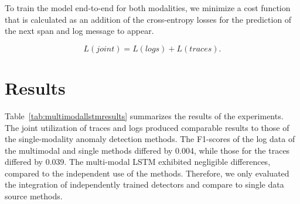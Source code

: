 To train the model end-to-end for both modalities, we minimize a cost function that is calculated as an addition of the  cross-entropy losses for the prediction of the next span and log message to appear.

\begin{equation}
    L(joint) = L(logs) + L(traces). 
\end{equation}



\begin{table}[!htbp]
\renewcommand{\arraystretch}{1.3}
\caption{Results: multimodal LSTM~\cite{nedelkoski2020jointmodalities}.}
\centering
\end{table}

\section{Results}
Table~\ref{tab:multimodallstmresults} summarizes the results of the experiments. The joint utilization of traces and logs produced comparable results to those of the single-modality anomaly detection methods. The F1-scores of the log data of the multimodal and single methods differed by 0.004, while those for the traces differed by 0.039. The multi-modal LSTM exhibited negligible differences, compared to the independent use of the methods. Therefore, we only evaluated the integration of independently trained detectors and compare to single data source methods. 